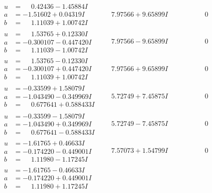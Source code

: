 \documentclass[1p]{elsarticle_modified}
\theoremstyle{definition}
\begin{document}
$$\begin{array}{c|c|c}
\begin{aligned}
u &= \phantom{-}0.42436 - 1.45884 I \\
a &= -1.51602 + 0.04319 I \\
b &= \phantom{-}1.11039 + 1.00742 I\end{aligned}
 & \phantom{-}7.97566 + 9.65899 I & \phantom{-0.000000 } 0 \\ \hline\begin{aligned}
u &= \phantom{-}1.53765 + 0.12330 I \\
a &= -0.300107 - 0.447420 I \\
b &= \phantom{-}1.11039 - 1.00742 I\end{aligned}
 & \phantom{-}7.97566 - 9.65899 I & \phantom{-0.000000 } 0 \\ \hline\begin{aligned}
u &= \phantom{-}1.53765 - 0.12330 I \\
a &= -0.300107 + 0.447420 I \\
b &= \phantom{-}1.11039 + 1.00742 I\end{aligned}
 & \phantom{-}7.97566 + 9.65899 I & \phantom{-0.000000 } 0 \\ \hline\begin{aligned}
u &= -0.33599 + 1.58079 I \\
a &= -1.043490 - 0.349969 I \\
b &= \phantom{-}0.677641 + 0.588433 I\end{aligned}
 & \phantom{-}5.72749 + 7.45875 I & \phantom{-0.000000 } 0 \\ \hline\begin{aligned}
u &= -0.33599 - 1.58079 I \\
a &= -1.043490 + 0.349969 I \\
b &= \phantom{-}0.677641 - 0.588433 I\end{aligned}
 & \phantom{-}5.72749 - 7.45875 I & \phantom{-0.000000 } 0 \\ \hline\begin{aligned}
u &= -1.61765 + 0.46633 I \\
a &= -0.174220 - 0.449001 I \\
b &= \phantom{-}1.11980 - 1.17245 I\end{aligned}
 & \phantom{-}7.57073 + 1.54799 I & \phantom{-0.000000 } 0 \\ \hline\begin{aligned}
u &= -1.61765 - 0.46633 I \\
a &= -0.174220 + 0.449001 I \\
b &= \phantom{-}1.11980 + 1.17245 I\end{aligned}

\end{array}$$
\end{document}
